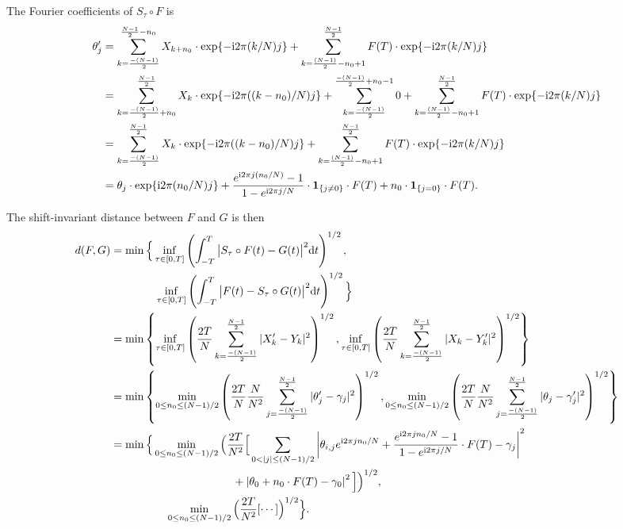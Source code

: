 The Fourier coefficients of $S_\tau \circ F$ is
\begin{align*}
	\theta_j' 
	&= \sum_{k=\frac{-(N-1)}{2}}^{\frac{N-1}{2}-n_0} X_{k+n_0} \cdot \exp\{-\complexunit{}2\pi ({k}/{N})j\} + 
	\sum_{k=\frac{(N-1)}{2}-n_0+1}^{\frac{N-1}{2}} F(T) \cdot \exp\{-\complexunit{}2\pi ({k}/{N})j\} \\
	&= \sum_{k=\frac{-(N-1)}{2}+n_0}^{\frac{N-1}{2}} X_{k} 
	\cdot \exp\{-\complexunit{}2\pi ({(k-n_0)}/{N})j\} 
	+ \sum_{k=\frac{-(N-1)}{2}}^{\frac{-(N-1)}{2}+n_0-1} 0 
	+ \sum_{k=\frac{(N-1)}{2}-n_0+1}^{\frac{N-1}{2}} F(T) \cdot \exp\{-\complexunit{}2\pi ({k}/{N})j\}
	\\
	&= \sum_{k=\frac{-(N-1)}{2}}^{\frac{N-1}{2}} X_{k} \cdot 
	\exp\{-\complexunit{}2\pi ({(k-n_0)}/{N})j\} 
	+ \sum_{k=\frac{(N-1)}{2}-n_0+1}^{\frac{N-1}{2}} F(T) \cdot \exp\{-\complexunit{}2\pi ({k}/{N})j\}
	\\
	&= \theta_j \cdot \exp \{ \complexunit{}2\pi (n_0/N)j \} + \frac{e^{\complexunit{}2\pi j (n_0/N)}-1}{1-e^{\complexunit{}2\pi j /N}} \cdot \mathbf{1}_{\left\{ j\neq0 \right\}}\cdot F(T) + n_0 \cdot \mathbf{1}_{\left\{ j=0 \right\}}\cdot F(T)
	.
\end{align*}

The shift-invariant distance between $F$ and $G$ is then 
\begin{align*}
	 d(F, G) 
	 &= \min\Big\{ \inf_{\tau\in[0,T]} 
	 \left( \int_{-T}^T\big| S_\tau\circ F(t)-G(t) \big|^2 \text{d}t \right)^{1/2}, \\
	 & \qquad \quad \quad \inf_{\tau\in[0,T]}\left( \int_{-T}^T
	 \big| F(t)-S_\tau\circ G(t) \big|^2 \text{d}t \right)^{1/2} \Big\} \\
	 &= \min\left\{ \inf_{\tau\in[0,T]} 
	 \left( 
	 	\frac{2T}{N} \sum_{k=\frac{-(N-1)}{2}}^{\frac{N-1}{2}} |X_k'-Y_k|^2
	 \right)^{1/2}, 
	  \inf_{\tau\in[0,T]}\left( 
	  \frac{2T}{N} \sum_{k=\frac{-(N-1)}{2}}^{\frac{N-1}{2}} |X_k-Y_k'|^2
	 \right)^{1/2} \right\} \\
	 &= \min \left\{ 
	 	\min_{0\leq n_0\leq (N-1)/2} 
	 	\left(\frac{2T}{N}\frac{N}{N^2} 
	 		 	\sum_{j=\frac{-(N-1)}{2}}^{\frac{N-1}{2}}
	 		 	|\theta_j' - \gamma_j|^2 \right)^{1/2} ,
	 	\min_{0\leq n_0\leq (N-1)/2} 
	 	\left(\frac{2T}{N}\frac{N}{N^2} 
	 		 	\sum_{j=\frac{-(N-1)}{2}}^{\frac{N-1}{2}}
	 		 	|\theta_j - \gamma_j'|^2 \right)^{1/2}
	  \right\} \\
	  &= \min \Big\{ 
	 	\min_{0\leq n_0\leq (N-1)/2} 
	 	\Big(\frac{2T}{N^2}
	 		\Big[\sum_{0<|j|\leq (N-1)/2}
				\left| \theta_{i,j}e^{\complexunit 2\pi j n_0/N}+
				\frac{e^{\complexunit{}2\pi j n_0/N}-1}{1-e^{\complexunit{}2\pi j /N}} \cdot F(T)
				-\gamma_{j} \right|^2 \\
				& \quad \quad \quad \quad \quad \qquad \qquad \qquad
				+ \left| \theta_0+n_0\cdot F(T)-\gamma_0 \right|^2 \Big]
	 	\Big)^{1/2}, \\
	 	& \quad \quad \quad \quad \quad 
	 	\min_{0\leq n_0\leq (N-1)/2} 
	 	\Big(\frac{2T}{N^2}
	 		[\cdots] 
	 	\Big)^{1/2}
	  \Big\}.
\end{align*}

